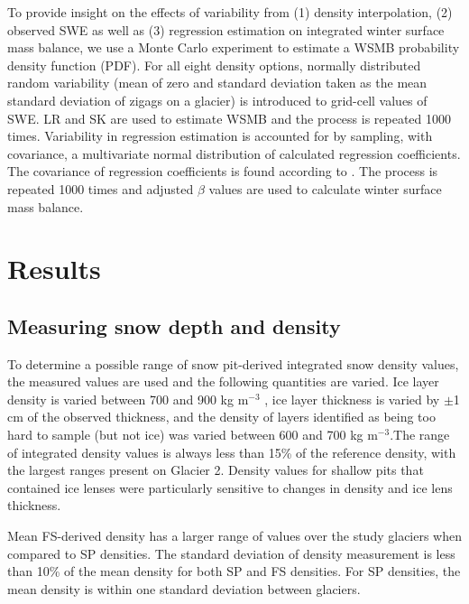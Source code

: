 \documentclass[twocolumn,letterpaper]{igs}
\begin{document}
To provide insight on the effects of variability from (1) density interpolation, (2) observed SWE as well as (3) regression estimation on integrated winter surface mass balance, we use a Monte Carlo experiment \citep{Metropolis1949} to estimate a WSMB probability density function (PDF). For all eight density options, normally distributed random variability (mean of zero and standard deviation taken as the mean standard deviation of zigags on a glacier) is introduced to grid-cell values of SWE. LR and SK are used to estimate WSMB and the process is repeated 1000 times.  Variability in regression estimation is accounted for by sampling, with covariance, a multivariate normal distribution of calculated regression coefficients. The covariance of regression coefficients is found according to \cite{Bagos2015}. The process is repeated 1000 times and adjusted $\beta$ values are used to calculate winter surface mass balance. 

\pagebreak
\section{Results}

\subsection{Measuring snow depth and density}

To determine a possible range of snow pit-derived integrated snow density values, the measured values are used and the following quantities are varied. Ice layer density is varied between 700 and 900 kg m$^{-3}$ , ice layer thickness is varied by $\pm$1 cm of the observed thickness, and the density of layers identified as being too hard to sample (but not ice) was varied between 600 and 700 kg m$^{-3}$.The range of integrated density values is always less than 15\% of the reference density, with the largest ranges present on Glacier 2. Density values for shallow pits that contained ice lenses were particularly sensitive to changes in density and ice lens thickness.



Mean FS-derived density has a larger range of values over the study glaciers when compared to SP densities. The standard deviation of density measurement is less than 10\% of the mean density for both SP and FS densities. For SP densities, the mean density is within one standard deviation between glaciers.
\end{document}
